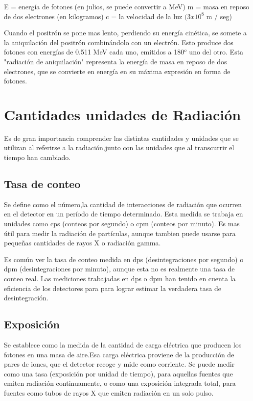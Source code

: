 \documentclass[12pt,fleqn]{book} %
\numberwithin{equation}{section} %
\numberwithin{figure}{section} %
\numberwithin{table}{section} %
\begin{document}
{\begin{itemize}
\begin{itemize}
\subitem E = energía de fotones (en julios, se puede convertir a MeV)
\subitem  m = masa en reposo de dos electrones (en kilogramos)
\subitem  c = la velocidad de la luz $(3 x 10^{8}$ m / seg)
 
Cuando el positrón se pone mas lento, perdiendo su energía cinética, se somete a la aniquilación del positrón combinándolo con un electrón. Esto produce dos fotones con energías de 0.511 MeV cada uno, emitidos a 180$^{o}$ uno del otro. Esta "radiación de aniquilación" representa la energía de masa en reposo de dos electrones, que se convierte en energía en su máxima expresión en forma de fotones.

\end{itemize}
\end{itemize}

\section{Cantidades unidades de Radiación}
Es de gran importancia comprender las distintas cantidades y unidades que se utilizan al referirse a la radiación,junto con las unidades que al transcurrir el tiempo han cambiado. 


\subsection{Tasa de conteo}
Se define como el número,la cantidad de interacciones de radiación que ocurren en el detector en un período de tiempo determinado. Esta medida se trabaja en unidades como cps (conteos por segundo) o cpm (conteos por minuto). Es mas útil para medir la radiación de partículas, aunque tambien puede usarse para pequeñas cantidades de rayos X o radiación gamma.

Es común ver la tasa de conteo medida en dps (desintegraciones por segundo) o dpm (desintegraciones por minuto), aunque esta no es realmente una tasa de conteo real. Las mediciones trabajadas en dps o dpm han tenido en cuenta la eficiencia de los detectores para para lograr estimar la verdadera tasa de desintegración.

\subsection{Exposición}
Se establece como la medida de la cantidad de carga eléctrica que producen  los fotones en una masa de aire.Esa carga eléctrica proviene de la producción de pares de iones, que el detector recoge y mide como corriente. Se puede medir como una tasa (exposición por unidad de tiempo), para aquellas fuentes que emiten radiación continuamente, o como una exposición integrada total, para fuentes como tubos de rayos X que emiten radiación en un solo pulso.

}
\end{document}
